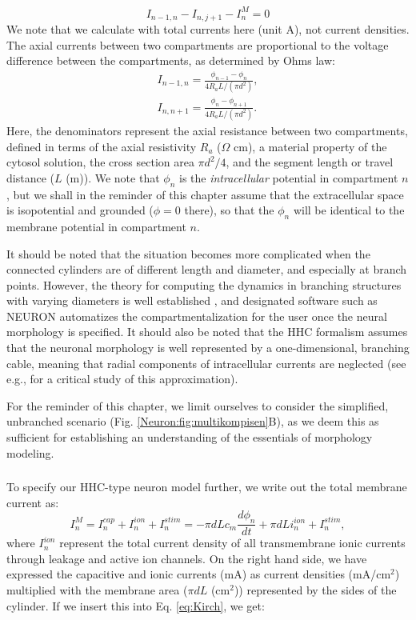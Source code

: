 \begin{equation}
I_{n-1,n} - I_{n,j+1} - I^M_n = 0
\label{eq:Kirch}
\end{equation}
We note that we calculate with total currents here (unit A), not current densities. The axial currents between two compartments are proportional to the voltage difference between the compartments, as determined by Ohms law:
\begin{eqnarray}
I_{n-1,n} = \frac{\phi_{n-1}-\phi_n}{4 R_a L/(\pi d^2)}, \nonumber \\ 
I_{n,n+1} = \frac{\phi_{n}-\phi_{n+1}}{4 R_a L/(\pi d^2)}.
\label{eq:axialcurrents}
\end{eqnarray}
Here, the denominators represent the axial resistance between two compartments, defined in terms of the axial resistivity $R_a$ ($\Omega$ cm), a material property of the cytosol solution, the cross section area $\pi d^2/4$, and the segment length or travel distance ($L$ (m)). We note that $\phi_n$ is the \emph{intracellular} potential in compartment $n$, but we shall in the reminder of this chapter assume that the extracellular space is isopotential and grounded ($\phi = 0$ there), so that the $\phi_n$ will be identical to the membrane potential in compartment $n$.

It should be noted that the situation becomes more complicated when the connected cylinders are of different length and diameter, and especially at branch points. However, the theory for computing the dynamics in branching structures with varying diameters is well established \cite{Rall1977,Rall1989}, and designated software such as NEURON \cite{Hines1997, Hines2009} automatizes the compartmentalization for the user once the neural morphology is specified. It should also be noted that the HHC formalism assumes that the neuronal morphology is well represented by a one-dimensional, branching cable, meaning that radial components of intracellular currents are neglected (see e.g.,\cite{lindsay2004maxwell} for a critical study of this approximation). 

For the reminder of this chapter, we limit ourselves to consider the simplified, unbranched scenario (Fig. \ref{Neuron:fig:multikompisen}B), as we deem this as sufficient for establishing an understanding of the essentials of morphology modeling. 


\subsubsection{}
To specify our HHC-type neuron model further, we write out the total membrane current as:
\begin{equation}
I^M_n = I_n^{cap} + I_n^{ion} + I_n^{stim} = -\pi d L c_m \frac{d\phi_n}{dt} + \pi d L i_n^{ion} + I_n^{stim}, 
\label{eq:Imemb}
\end{equation}
where $I_n^{ion}$ represent the total current density of all transmembrane ionic currents through leakage and active ion channels. On the right hand side, we have expressed the capacitive and ionic currents (mA) as current densities (mA/cm$^2$) multiplied with the membrane area ($\pi d L$ (cm$^2$)) represented by the sides of the cylinder. If we insert this into Eq. \ref{eq:Kirch}, we get:

